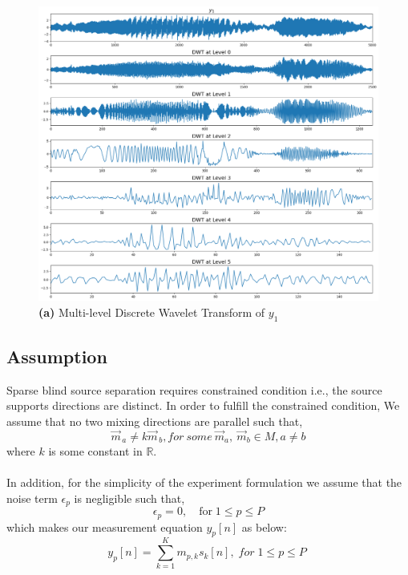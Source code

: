 \documentclass[a4paper,11pt]{article}
\begin{document}
\begin{figure}[H]
    \centering
    \includegraphics[width=0.65\linewidth]{sources/wt.png}
    \caption{\textbf{(a)} Multi-level Discrete Wavelet Transform of $y_1$}
    \label{fig:my_label}
\end{figure}



\subsection{Assumption}
Sparse blind source separation requires constrained condition i.e., the source supports directions are distinct. In order to fulfill the constrained condition, We assume that no two mixing directions are parallel such that,
\begin{equation}
\vec{m}_{\,a} \neq k\vec{m}_{\,b}, for \ some \ \vec{m}_a, \ \vec{m}_b \in M, a \neq b
\end{equation} 
where $k$ is some constant in $\mathbb{R}$.\\
\\
In addition, for the simplicity of the experiment formulation we assume that the noise term $\epsilon_p$ is negligible such that,
\begin{equation}
    \epsilon_p = 0, \quad \text{for} \; 1\leq p \leq P
\end{equation}
which makes our measurement equation $y_p[n]$ as below:
\begin{equation}
    y_p[n] = \sum \limits _{{k=1 }}^{K}{m_{p,k}}{s_k[n]}, \;for \;   1\leqslant{p}\leqslant{P} \;
\end{equation}
\end{document}
